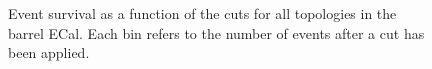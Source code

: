 \begin{figure}
\begin{minipage}{.5\linewidth}
\end{minipage}%
\begin{minipage}{.5\linewidth}
\centering
{}
\end{minipage}\par\medskip
\caption{Event survival as a function of the cuts for all topologies in the barrel ECal.  Each bin refers to the number of events after a cut has been applied.}
\label{fig:SelEventSurvivalBarrel}
\end{figure}
